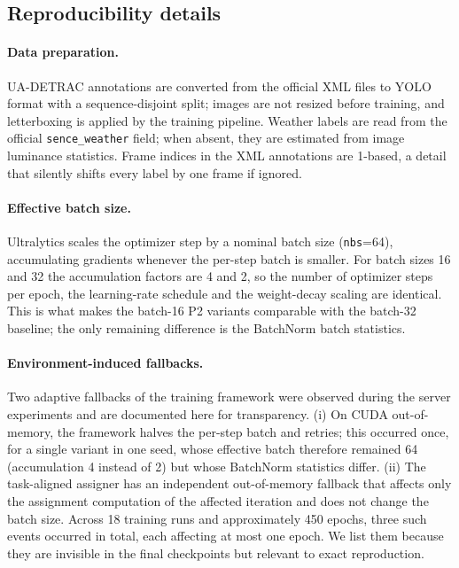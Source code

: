 \documentclass[pdflatex,sn-basic,Numbered]{sn-jnl}%
\begin{document}
\begin{appendices}

\section{Reproducibility details}\label{app:repro}

\paragraph{Data preparation.} UA-DETRAC annotations are converted from the official XML files to YOLO format with a sequence-disjoint split; images are not resized before training, and letterboxing is applied by the training pipeline. Weather labels are read from the official \texttt{sence\_weather} field; when absent, they are estimated from image luminance statistics. Frame indices in the XML annotations are 1-based, a detail that silently shifts every label by one frame if ignored.

\paragraph{Effective batch size.} Ultralytics scales the optimizer step by a nominal batch size (\texttt{nbs}=64), accumulating gradients whenever the per-step batch is smaller. For batch sizes 16 and 32 the accumulation factors are 4 and 2, so the number of optimizer steps per epoch, the learning-rate schedule and the weight-decay scaling are identical. This is what makes the batch-16 P2 variants comparable with the batch-32 baseline; the only remaining difference is the BatchNorm batch statistics.

\paragraph{Environment-induced fallbacks.} Two adaptive fallbacks of the training framework were observed during the server experiments and are documented here for transparency. (i) On CUDA out-of-memory, the framework halves the per-step batch and retries; this occurred once, for a single variant in one seed, whose effective batch therefore remained 64 (accumulation 4 instead of 2) but whose BatchNorm statistics differ. (ii) The task-aligned assigner has an independent out-of-memory fallback that affects only the assignment computation of the affected iteration and does not change the batch size. Across 18 training runs and approximately 450 epochs, three such events occurred in total, each affecting at most one epoch. We list them because they are invisible in the final checkpoints but relevant to exact reproduction.


\end{appendices}
\end{document}
